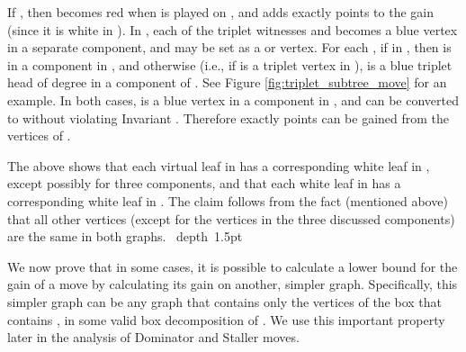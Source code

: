 \documentclass[11pt]{article}
\def\blackslug{\hbox{\hskip 1pt \vrule width 4pt height 8pt
    depth 1.5pt \hskip 1pt}}
\def\QED{\quad\blackslug\lower 8.5pt\null\par}
\theoremstyle{definition}
\begin{document}
If , then  becomes red when  is played on , and adds exactly  points to the gain (since it is white in ).
In , each of the triplet witnesses  and  becomes a blue vertex in a separate component, and may be set as a  or  vertex.
For each , if  in , then  is in a  component in , and otherwise (i.e., if  is a triplet vertex in ),  is a blue triplet head of degree  in a component of . See Figure \ref{fig:triplet_subtree_move} for an example.
In both cases,  is a blue vertex in a  component in , and can be converted to  without violating Invariant .
Therefore exactly  points can be gained from the vertices of .

The above shows that each virtual leaf in  has a corresponding white leaf in , except possibly for three  components, and that each white leaf in  has a corresponding white leaf in .
The claim follows from the fact (mentioned above) that all other vertices (except for the vertices in the three discussed  components) are the same in both graphs.
\QED

We now prove that in some cases, it is possible to calculate a lower bound for the gain of a move  by calculating its gain on another, simpler graph.
Specifically, this simpler graph can be any graph that contains only the vertices of the box  that contains , in some valid box decomposition  of .
We use this important property later in the analysis of Dominator and Staller moves.
\end{document}
